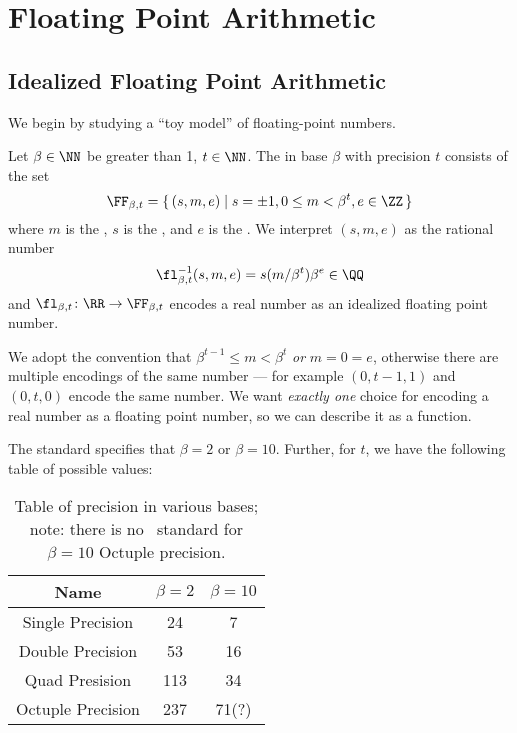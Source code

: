\chapter{Floating Point Arithmetic}

\section{Idealized Floating Point Arithmetic}

We begin by studying a ``toy model'' of floating-point numbers.

\begin{defn}
  Let $\beta\in\NN$ be greater than 1, $t\in\NN$. The
   in base $\beta$ with precision $t$
  consists of the set
  \begin{equation}
    \FF_{\beta,t} = \{\, (s,m,e)\mid s=\pm1, 0\leq m<\beta^{t},e\in\ZZ\,\}
  \end{equation}
  where $m$ is the , $s$ is the , and $e$ is the
  . We interpret $(s,m,e)$ as the rational number
  \begin{equation}
    \fl^{-1}_{\beta,t}(s,m,e) = s(m/\beta^{t})\beta^{e}\in\QQ
  \end{equation}
  and $\fl_{\beta,t}\colon\RR\to\FF_{\beta,t}$ encodes a real number as an
  idealized floating point number.
\end{defn}

\begin{rmk}
We adopt the convention that $\beta^{t-1}\leq m<\beta^{t}$ \emph{or} $m=0=e$, otherwise there are
multiple encodings of the same number --- for example $(0,t-1,1)$ and
$(0,t,0)$ encode the same number. We want \emph{exactly one} choice for
encoding a real number as a floating point number, so we can describe it
as a function.
\end{rmk}

\begin{rmk}
  The  standard specifies that $\beta=2$ or $\beta=10$. Further,
  for $t$, we have the following table of possible values:
\begin{table}[h!]
  \centering
  \begin{tabular}{ |c|c|c| }
    \hline
 Name              & $\beta=2$ & $\beta=10$ \\ \hline
 Single Precision  & 24  & 7 \\  
 Double Precision  & 53  & 16\\
 Quad Presision    & 113 & 34\\
 Octuple Precision & 237 & 71(?)\\
 \hline
\end{tabular}
\caption{Table of precision in various bases; note: there is no
  \ieee\ standard for $\beta=10$ Octuple precision.}
\end{table}
\end{rmk}

